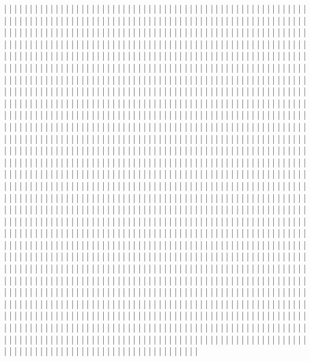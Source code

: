 | | | | | | | | | | | | | | | | | | | | | | | | | | | | | | | | | | | | | | | | | | | | | | | | | | | | | | | | | | | | | | | | | | | | | | | | | | | | | | | | | | | | | | | | | | | | | | | | | | | | | | | | | | | | | | | | | | | | | | | | | | | | | | | | | | | | | | | | | | | | | | | | | | | | | | | | | | | | | | | | | | | | | | | | | | | | | | | | | | | | | | | | | | | | | | | | | | | | | | | | | | | | | | | | | | | | | | | | | | | | | | | | | | | | | | | | | | | | | | | | | | | | | | | | | | | | | | | | | | | | | | | | | | | | | | | | | | | | | | | | | | | | | | | | | | | | | | | | | | | | | | | | | | | | | | | | | | | | | | | | | | | | | | | | | | | | | | | | | | | | | | | | | | | | | | | | | | | | | | | | | | | | | | | | | | | | | | | | | | | | | | | | | | | | | | | | | | | | | | | | | | | | | | | | | | | | | | | | | | | | | | | | | | | | | | | | | | | | | | | | | | | | | | | | | | | | | | | | | | | | | | | | | | | | | | | | | | | | | | | | | | | | | | | | | | | | | | | | | | | | | | | | | | | | | | | | | | | | | | | | | | | | | | | | | | | | | | | | | | | | | | | | | | | | | | | | | | | | | | | | | | | | | | | | | | | | | | | | | | | | | | | | | | | | | | | | | | | | | | | | | | | | | | | | | | | | | | | | | | | | | | | | | | | | | | | | | | | | | | | | | | | | | | | | | | | | | | | | | | | | | | | | | | | | | | | | | | | | | | | | | | | | | | | | | | | | | | | | | | | | | | | | | | | | | | | | | | | | | | | | | | | | | | | | | | | | | | | | | | | | | | | | | | | | | | | | | | | | | | | | | | | | | | | | | | | | | | | | | | | | | | | | | | | | | | | | | | | | | | | | | | | | | | | | | | | | | | | | | | | | | | | | | | | | | | | | | | | | | | | | | | | | | | | | | | | | | | | | | | | | | | | | | | | | | | | | | | | | | | | | | | | | | | | | | | | | | | | | | | | | | | | | | | | | | | | | | | | | | | | | | | | | | | | | | | | | | | | | | | | | | | | | | | | | | | | | | | | | | | | | | | | | | | | | | | | | | | | | | | | | | | | | | | | | | | | | | | | | | | | | | | | | | | | | | | | | | | | | | | | | | | | | | | | | | | | | | | | | | | | | | | | | | | | | | | | | | | | | | | | | | | | | | | | | | | | | | | | | | | | | | | | | | | | | | | | | | | | | | | | | | | | | | | | | | | | | | | | | | | | | | | | | | | | | | | | | | | | | | | | | | | | | | | | | | | | | | | | | | | | | | | | | | | | | | | | | | | | | | | | | | | | | | | | | | | | | | | | | | | | | | | | | | | | | | | | | | | | | | | | | | | | | | | | | | | | | | | | | | | | | | | | | | | | | | | | | | | | | | | | | | | | | | | | | | | | | | | | | | | | | | | | | | | | | | | | | | | | | | | | | | | | | | | | | | | | | | | | | | | | | | | | | | | | | | | | | | | | | | | | | | | | | | | | | | | | | | | | | | | | | | | | | | | | | | | | | | | | | | | | | | | | | | | | | | | | | | | | | | | | | | | | | | | | | | | | | | | | | | | | | | | | | | | | | | | | | | | | | | | | | | | | | | | | | | | | | | | | | | | | | | | | | | | | | | | | | | | | | | | | | | | | | | | | | | | | | | | | | | | | | | | | | | | | | | | | | | | | | | | | | | | | | | | | | | | | | | | | | | | | | | | | | | | | | | | | | | | | | | | | | | | | | | | | | | | | | | | | | | | | | | | | | | | | | | | | | | | | | | | | | | | | | | | | | | | | | | | | | | | | | | | | | | | | | | | | | | | | | | | | | | | | | | | | | | | | | | | | | | | | | | | | | | | | | | | | | | | | | | | | | | | | | | | | | | | | | | | | | | | | | | | | | | | | | | | | | | | | | | | | | | | | | | | | | | | | | | | | | | | | | | | | | | | | | |